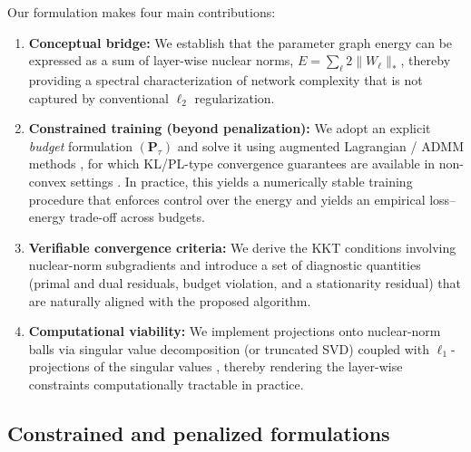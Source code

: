 \documentclass[a4paper,fleqn]{cas-sc}
\theoremstyle{remark}
\theoremstyle{definition}
\begin{document}
Our formulation makes four main contributions:
\begin{enumerate}[leftmargin=*]
  \item \textbf{Conceptual bridge:} We establish that the parameter graph energy can be expressed as a sum of layer-wise nuclear norms, $E=\sum_\ell 2\|W_\ell\|_\ast$, thereby providing a spectral characterization of network complexity that is not captured by conventional $\ell_2$ regularization.
  \item \textbf{Constrained training (beyond penalization):} We adopt an explicit \emph{budget} formulation $(\mathbf{P}_\tau)$ and solve it using augmented Lagrangian / ADMM methods \cite{Rockafellar1976AugLag,Boyd2011ADMM,Bertsekas1999Nonlinear}, for which KL/PL-type convergence guarantees are available in non-convex settings \cite{Attouch2013KL,Polyak1963,Nesterov2004}. In practice, this yields a numerically stable training procedure that enforces control over the energy  and yields an empirical loss--energy trade-off across budgets. 
  \item \textbf{Verifiable convergence criteria:} We derive the KKT conditions involving nuclear-norm subgradients \cite{Watson1992Subdiff} and introduce a set of diagnostic quantities (primal and dual residuals, budget violation, and a stationarity residual) that are naturally aligned with the proposed algorithm.
  \item \textbf{Computational viability:} We implement projections onto nuclear-norm balls via singular value decomposition (or truncated SVD) coupled with $\ell_1$-projections of the singular values \cite{Cai2010SVT,Duchi2008L1proj}, thereby rendering the layer-wise constraints computationally tractable in practice.
\end{enumerate}


\subsection{Constrained and penalized formulations}
\end{document}
